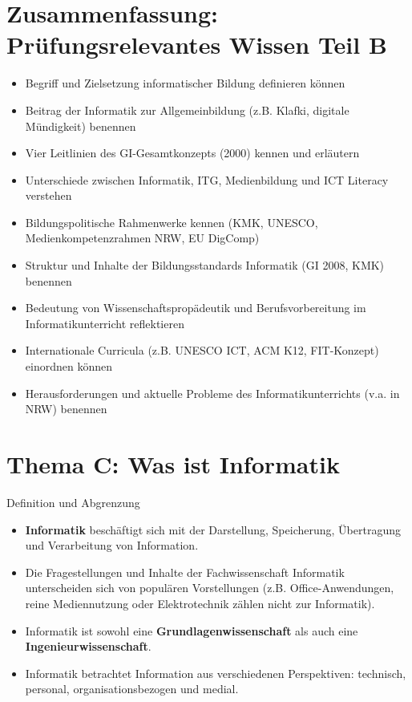 \documentclass{article}
\begin{document}
\section{Zusammenfassung: Prüfungsrelevantes Wissen Teil B}

\begin{itemize}
    \item Begriff und Zielsetzung informatischer Bildung definieren können
    \item Beitrag der Informatik zur Allgemeinbildung (z.B. Klafki, digitale Mündigkeit) benennen
    \item Vier Leitlinien des GI-Gesamtkonzepts (2000) kennen und erläutern
    \item Unterschiede zwischen Informatik, ITG, Medienbildung und ICT Literacy verstehen
    \item Bildungspolitische Rahmenwerke kennen (KMK, UNESCO, Medienkompetenzrahmen NRW, EU DigComp)
    \item Struktur und Inhalte der Bildungsstandards Informatik (GI 2008, KMK) benennen
    \item Bedeutung von Wissenschaftspropädeutik und Berufsvorbereitung im Informatikunterricht reflektieren
    \item Internationale Curricula (z.B. UNESCO ICT, ACM K12, FIT-Konzept) einordnen können
    \item Herausforderungen und aktuelle Probleme des Informatikunterrichts (v.a. in NRW) benennen
\end{itemize}

\section{Thema C: Was ist Informatik}
\begin{block}{Definition und Abgrenzung}
    \begin{itemize}
        \item \textbf{Informatik} beschäftigt sich mit der Darstellung, Speicherung, Übertragung und Verarbeitung von Information.
        \item Die Fragestellungen und Inhalte der Fachwissenschaft Informatik unterscheiden sich von populären Vorstellungen (z.B. Office-Anwendungen, reine Mediennutzung oder Elektrotechnik zählen nicht zur Informatik).
        \item Informatik ist sowohl eine \textbf{Grundlagenwissenschaft} als auch eine \textbf{Ingenieurwissenschaft}.
        \item Informatik betrachtet Information aus verschiedenen Perspektiven: technisch, personal, organisationsbezogen und medial.
    \end{itemize}
\end{block}
\end{document}
